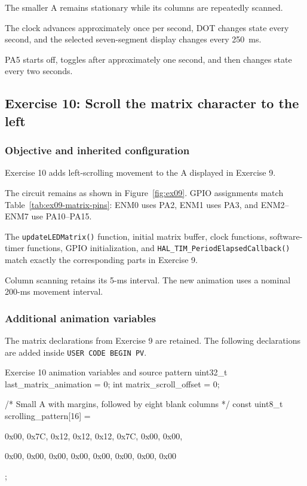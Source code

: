 \documentclass[a4paper]{article}
\begin{document}
The smaller A remains stationary while
its columns are repeatedly scanned.

The clock advances approximately once
per second, DOT changes state every second,
and the selected seven-segment display
changes every 250~ms.

PA5 starts off, toggles after approximately
one second, and then changes state every
two seconds.


\subsection{Exercise 10: Scroll the matrix character to the left}

\subsubsection{Objective and inherited configuration}

Exercise 10 adds left-scrolling movement
to the A displayed in Exercise 9.

The circuit remains as shown in
Figure~\ref{fig:ex09}. GPIO assignments
match Table~\ref{tab:ex09-matrix-pins}:
ENM0 uses PA2, ENM1 uses PA3, and
ENM2--ENM7 use PA10--PA15.

The \texttt{updateLEDMatrix()} function,
initial matrix buffer, clock functions,
software-timer functions, GPIO initialization,
and \texttt{HAL\_TIM\_PeriodElapsedCallback()}
match exactly the corresponding parts
in Exercise 9.

Column scanning retains its 5-ms interval.
The new animation uses a nominal 200-ms
movement interval.

\subsubsection{Additional animation variables}

The matrix declarations from Exercise 9
are retained. The following declarations
are added inside \texttt{USER CODE BEGIN PV}.

\begin{stmcode}{Exercise 10 animation variables and source pattern}
uint32_t last_matrix_animation = 0;
int matrix_scroll_offset = 0;

/* Small A with margins, followed by eight blank columns */
const uint8_t scrolling_pattern[16] = {
    0x00, 0x7C, 0x12, 0x12,
    0x12, 0x7C, 0x00, 0x00,

    0x00, 0x00, 0x00, 0x00,
    0x00, 0x00, 0x00, 0x00
};
\end{stmcode}
\end{document}
